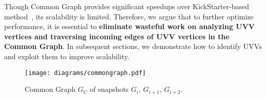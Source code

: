 Though Common Graph provides significant speedups over KickStarter-based method~\cite{CommonGraph}, its scalability is limited. 
Therefore, we argue that to further optimize performance, it is essential to \textbf{eliminate wasteful work on analyzing UVV vertices and traversing incoming edges of UVV vertices in the Common Graph}. In subsequent sections, we demonstrate how to identify UVVs and exploit them to improve scalability. 





\iffalse
\begin{figure}[!t]
    \centering
    \texttt{[image: diagrams/Normalized.pdf]}
    \caption{Showing the normalized number of edge additions and edge deletions for the \emph{streaming}, \emph{direct hop}, and \emph{work sharing} scenarios applied to the TTW graph.}
    \label{fig:addition_number}
    \vspace{-0.15in}
\end{figure}
\fi

\begin{figure}[!t]
    \centering
    \texttt{[image: diagrams/commongraph.pdf]}
    \vspace{-0.15in}
    \caption{Common Graph $G_{C}$ of snapshots $G_i$, $G_{i+1}$, $G_{i+2}$.}
    \label{fig:commongraph}
    \vspace{-0.1in}
\end{figure}